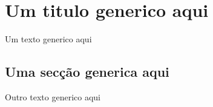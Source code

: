 \chapter{Um titulo generico aqui}

Um texto generico aqui

\section*{Uma secção generica aqui}

Outro texto generico aqui